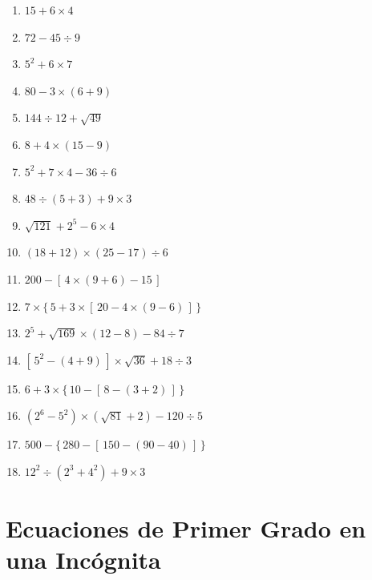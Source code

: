 \documentclass[12pt, letterpaper]{article}
\begin{document}
\begin{enumerate}[leftmargin=*]
  \item \facil{} $15 + 6 \times 4$

  \item \facil{} $72 - 45 \div 9$

  \item \facil{} $5^2 + 6 \times 7$

  \item \facil{} $80 - 3 \times (6 + 9)$

  \item \facil{} $144 \div 12 + \sqrt{49}$

  \item \medio{} $8 + 4 \times (15 - 9)$

  \item \medio{} $5^2 + 7 \times 4 - 36 \div 6$

  \item \medio{} $48 \div (5 + 3) + 9 \times 3$

  \item \medio{} $\sqrt{121} + 2^5 - 6 \times 4$

  \item \medio{} $(18 + 12) \times (25 - 17) \div 6$

  \item \medio{} $200 - [\,4 \times (9 + 6) - 15\,]$

  \item \dificil{} $7 \times \{\,5 + 3 \times [\,20 - 4 \times (9 - 6)\,]\,\}$

  \item \dificil{} $2^5 + \sqrt{169} \times (12 - 8) - 84 \div 7$

  \item \dificil{} $[\,5^2 - (4 + 9)\,] \times \sqrt{36} + 18 \div 3$

  \item \dificil{} $6 + 3 \times \{\,10 - [\,8 - (3 + 2)\,]\,\}$

  \item \dificil{} $(2^6 - 5^2) \times (\sqrt{81} + 2) - 120 \div 5$

  \item \dificil{} $500 - \{\,280 - [\,150 - (90 - 40)\,]\,\}$

  \item \dificil{} $12^2 \div (2^3 + 4^2) + 9 \times 3$
\end{enumerate}

\section{Ecuaciones de Primer Grado en una Incógnita}
\end{document}

